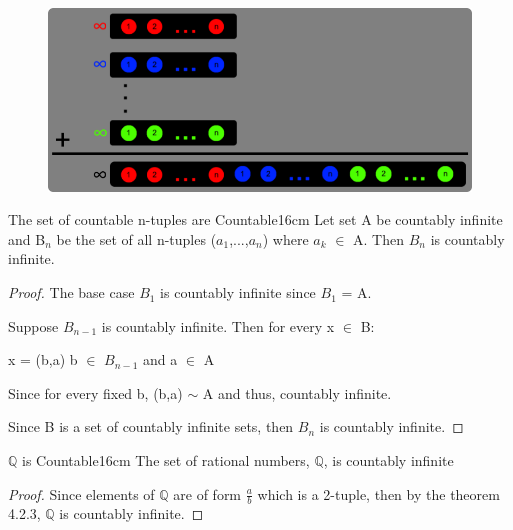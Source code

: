 	\begin{figure}[h]
		\centering
		\includegraphics[scale=0.32]{Images/4.2.2.png}
	\end{figure}



	\begin{wtheorem}{The set of countable n-tuples are Countable}{16cm}
		Let set A be countably infinite and B$_n$ be the set of all
		n-tuples ($a_1$,...,$a_n$) where $a_k$ $\in$ A.
		Then $B_n$ is countably infinite.
	\end{wtheorem}
	
	\begin{proof}
		The base case $B_1$ is countably infinite since $B_1$ = A.

		Suppose $B_{n-1}$ is countably infinite. Then for every x $\in$ B:

		\qquad x = (b,a) \qquad \qquad b $\in$ $B_{n-1}$ and a $\in$ A

		Since for every fixed b, (b,a) $\sim$ A and thus, countably infinite.

		Since B is a set of countably infinite sets, then $B_{n}$
		is countably infinite.
	\end{proof}
	
	\newpage
	
	
	
	\begin{wtheorem}{$\mathbb{Q}$ is Countable}{16cm}
		The set of rational numbers, $\mathbb{Q}$, is countably infinite 
	\end{wtheorem}
	
	\begin{proof}
		Since elements of $\mathbb{Q}$ are of form $\frac{a}{b}$ which is a
		2-tuple, then by the {\color{red} theorem 4.2.3},
		$\mathbb{Q}$ is countably infinite. 
	\end{proof}

	\vspace{0.1cm}


